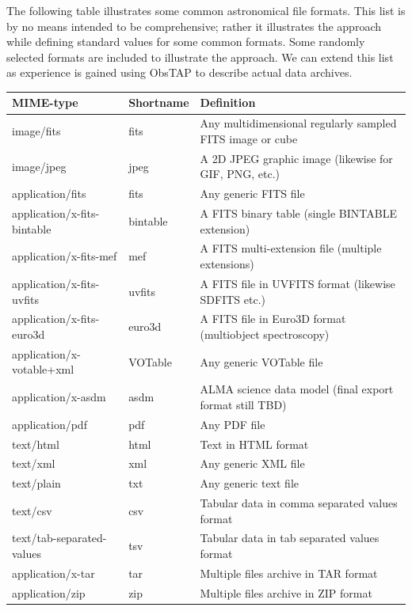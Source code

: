 \documentclass[11pt,a4paper]{ivoa}
\begin{document}
The following table illustrates some common astronomical file formats.  This list is by no means intended to be
comprehensive; rather it illustrates the approach while defining standard values for some common formats.  Some
randomly selected formats are included to illustrate the approach.  We can extend this list as experience is gained
using ObsTAP to describe actual data archives.

\begin{tabular}{|p{}|p{}|p{}|}
\hline
MIME-type & Shortname & Definition\\\hline 
image/fits   & fits & Any multidimensional regularly sampled FITS image or cube\\\hline
image/jpeg   & jpeg & A 2D JPEG graphic image (likewise for GIF, PNG, etc.)\\\hline
application/fits & fits & Any generic FITS file\\\hline
application/x-fits-bintable & bintable & A FITS binary table (single BINTABLE extension)\\\hline
application/x-fits-mef & mef & A FITS multi-extension file (multiple extensions)\\\hline
application/x-fits-uvfits & uvfits & A FITS file in UVFITS format (likewise SDFITS etc.)\\\hline
application/x-fits-euro3d & euro3d & A FITS file in Euro3D format (multiobject spectroscopy)\\\hline
application/x-votable+xml & VOTable & Any generic VOTable file\\\hline
application/x-asdm  & asdm & ALMA science data model (final export format still TBD)\\\hline
application/pdf & pdf & Any PDF file\\\hline
text/html   & html & Text in HTML format\\\hline
text/xml & xml & Any generic XML file\\\hline
text/plain & txt & Any generic text file\\\hline
text/csv & csv & Tabular data in comma separated values format\\\hline
text/tab-separated-values & tsv & Tabular data in tab separated values format\\\hline
application/x-tar & tar & Multiple files archive in TAR format\\\hline
application/zip & zip & Multiple files archive in ZIP format\\\hline

\end{tabular}
\end{document}

